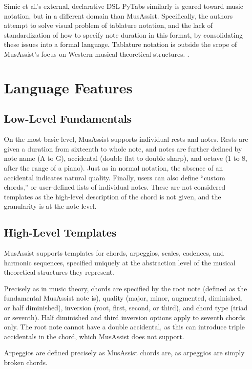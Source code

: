 \documentclass{article}
\begin{document}
Simic et al.'s external, declarative DSL PyTabs similarly is geared toward music notation, but in a different
domain than MusAssist. Specifically, 
the authors attempt to solve visual problem of  tablature  notation, 
and the lack of standardization of how  to specify note duration in this format, by consolidating 
these issues into a formal language. Tablature notation is outside the scope of MusAssist's focus on Western 
musical theoretical structures.
 \cite{simic_bal_dejanovic_vaderna}.

\section{Language Features}\label{sec:language_features}
\subsection{Low-Level Fundamentals}
On the most basic level, MusAssist supports individual rests and notes. Rests are  
given a duration from sixteenth to whole note, and notes are further defined by note name (A to G), 
accidental (double flat to double sharp), and octave (1 to 8, after the range of a piano).
Just as in normal notation, the absence of an accidental indicates natural quality.
Finally, users can also define ``custom chords,'' or user-defined lists of individual notes.
These are not considered templates as the high-level description of the chord is not given, and the
granularity is at the note level.

\subsection{High-Level Templates}
MusAssist supports templates for chords, arpeggios, scales, cadences, and harmonic sequences, specified uniquely
at the abstraction level of the musical theoretical structures they represent.

Precisely as in music theory, chords are specified by the 
root note (defined as the fundamental MusAssist note is),
quality (major, minor, augmented, diminished, or half diminished), 
inversion (root, first, second, or third), and 
chord type (triad or seventh). 
Half diminished and third inversion options apply to seventh chords only. The root note 
cannot have a double accidental, as this can introduce triple accidentals in the chord, which MusAssist
does not support.

Arpeggios are defined precisely as MusAssist chords are, as arpeggios are simply broken chords.
\end{document}
